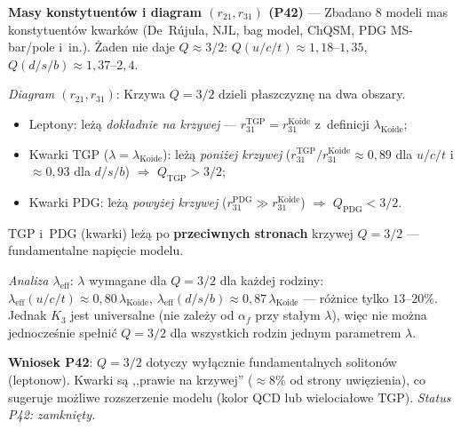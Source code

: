 \begin{problem}
\begin{description}[leftmargin=2em, labelindent=0pt]
  \textbf{Masy konstytuent\'ow i diagram $(r_{21}, r_{31})$ (P42)} ---
  Zbadano 8 modeli mas konstytuent\'ow kwark\'ow (De~R\'ujula, NJL,
  bag model, ChQSM, PDG MS-bar/pole i~in.).
  \.Zaden nie daje $Q \approx 3/2$:
  $Q(u/c/t) \approx 1{,}18$--$1{,}35$, $Q(d/s/b) \approx 1{,}37$--$2{,}4$.
  \par
  \emph{Diagram $(r_{21}, r_{31})$}:
  Krzywa $Q = 3/2$ dzieli p\l{}aszczyzn\k{e} na dwa obszary.
  \begin{itemize}[nosep]
    \item Leptony: le\.z\k{a} \emph{dok\l{}adnie na krzywej} ---
          $r_{31}^\mathrm{TGP} = r_{31}^\mathrm{Koide}$ z~definicji $\lambda_\mathrm{Koide}$;
    \item Kwarki TGP ($\lambda = \lambda_\mathrm{Koide}$): le\.z\k{a}
          \emph{poni\.zej krzywej}
          ($r_{31}^\mathrm{TGP}/r_{31}^\mathrm{Koide} \approx 0{,}89$
          dla $u/c/t$ i $\approx 0{,}93$ dla $d/s/b$)
          $\Rightarrow$ $Q_\mathrm{TGP} > 3/2$;
    \item Kwarki PDG: le\.z\k{a} \emph{powy\.zej krzywej}
          ($r_{31}^\mathrm{PDG} \gg r_{31}^\mathrm{Koide}$)
          $\Rightarrow$ $Q_\mathrm{PDG} < 3/2$.
  \end{itemize}
  TGP i~PDG (kwarki) le\.z\k{a} po \textbf{przeciwnych stronach} krzywej
  $Q = 3/2$ --- fundamentalne napi\k{e}cie modelu.
  \par
  \emph{Analiza $\lambda_\mathrm{eff}$}:
  $\lambda$ wymagane dla $Q = 3/2$ dla ka\.zdej rodziny:
  $\lambda_\mathrm{eff}(u/c/t) \approx 0{,}80\,\lambda_\mathrm{Koide}$,
  $\lambda_\mathrm{eff}(d/s/b) \approx 0{,}87\,\lambda_\mathrm{Koide}$
  --- r\'o\.znice tylko $13$--$20\%$.
  Jednak $K_3$ jest universalne (nie zale\.zy od $\alpha_f$ przy sta\l{}ym
  $\lambda$), wi\k{e}c nie mo\.zna jednocze\'snie spe\l{}ni\'c $Q = 3/2$
  dla wszystkich rodzin jednym parametrem $\lambda$.
  \par
  \textbf{Wniosek P42}: $Q = 3/2$ dotyczy wy\l{}\k{a}cznie fundamentalnych
  soliton\'ow (leptonow). Kwarki s\k{a} ,,prawie na krzywej'' ($\approx 8\%$
  od strony uwi\k{e}zienia), co sugeruje mo\.zliwe rozszerzenie modelu
  (kolor QCD lub wielocia\l{}owe TGP).
  \textit{Status P42: zamkni\k{e}ty.}


\end{description}
\end{problem}
